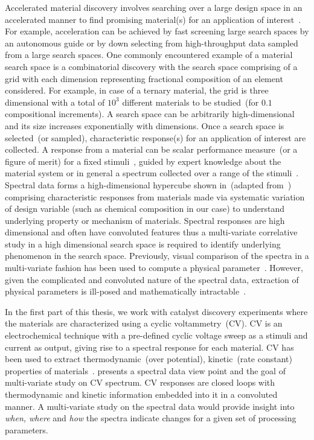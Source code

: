Accelerated material discovery involves searching over a large design space in an accelerated manner to find promising material(s) for an application of interest~\cite{rajan2013informatics,ajayi2016rapid}.
For example, acceleration can be achieved by fast screening large search spaces by an autonomous guide or by down selecting from high-throughput data sampled from a large search spaces. 
One commonly encountered example of a material search space is a combinatorial discovery with the search space comprising of a grid with each dimension representing fractional composition of an element considered.
For example, in case of a ternary material, the grid is three dimensional with a total of \(10^3\) different materials to be studied~(for \(0.1\) compositional increments). 
A search space can be arbitrarily high-dimensional and its size increases exponentially with dimensions. 
Once a search space is selected~(or sampled), characteristic response(s) for an application of interest are collected. 
A response from a material can be scalar performance measure~(or a figure of merit) for a fixed stimuli~\cite{haber2014high,suram2015generating}, guided by expert knowledge about the material system or in general a spectrum collected over a range of the stimuli~\cite{hattrick2016perspective}. 
Spectral data forms a high-dimensional hypercube shown in~(adapted from~\cite{rajan2013informatics}) comprising characteristic responses from materials made via systematic variation of design variable (such as chemical composition in our case) to understand underlying property or mechanism of materials.
Spectral responses are high dimensional and often have convoluted features thus a multi-variate correlative study in a high dimensional search space is required to identify underlying phenomenon in the search space.
Previously, visual comparison of the spectra in a multi-variate fashion has been used to compute a physical parameter~\cite{de2008core,de19902p}. 
However, given the complicated and convoluted nature of the spectral data, extraction of physical parameters is ill-posed and mathematically intractable~\cite{suzuki2019automated}. 

In the first part of this thesis, we work with catalyst discovery experiments where the materials are characterized using a cyclic voltammetry~(CV). 
CV is an electrochemical technique with a pre-defined cyclic voltage sweep as a stimuli and current as output, giving rise to a spectral response for each material. 
CV has been used to extract thermodynamic~(over potential), kinetic~(rate constant) properties of materials~\cite{martin2016qualitative,rountree2014evaluation,haber2014high}. 
 presents a spectral data view point and the goal of multi-variate study on CV spectrum. 
CV responses are closed loops with thermodynamic and kinetic information embedded into it in a convoluted manner. 
A multi-variate study on the spectral data would provide insight into \textit{when, where} and \textit{how} the spectra indicate changes for a given set of processing parameters.

